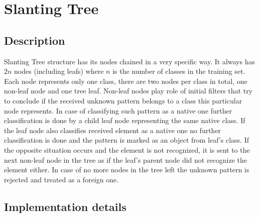 \section{Slanting Tree}

\subsection{Description}

Slanting Tree structure has its nodes chained in a very specific way. It always has $ 2n $ nodes (including leafs) where $n$ is the number of classes in the training set. Each node represents only one class, there are two nodes per class in total, one non-leaf node and one tree leaf. Non-leaf nodes play role of initial filters that try to conclude if the received unknown pattern belongs to a class this particular node represents. In case of classifying such pattern as a native one further classification is done by a child leaf node representing the same native class. If the leaf node also classifies received element as a native one no further classification is done and the pattern is marked as an object from leaf's class. If the opposite situation occurs and the element is not recognized, it is sent to the next non-leaf node in the tree as if the leaf's parent node did not recognize the element either. In case of no more nodes in the tree left the unknown pattern is rejected and treated as a foreign one.

\subsection{Implementation details}

